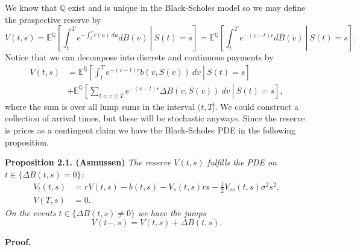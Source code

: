 \documentclass[
]{book}
\begin{document}
We know that \(\mathbb Q\) exist and is unique in the Black-Scholes model so we may define the prospective reserve by
\[
V(t,s)=\mathbb E^{\mathbb Q}\left[\left.\int_t^Te^{-\int_t^vr(u)\ du}dB(v)\ \right\vert\ S(t)=s\right]=\mathbb E^{\mathbb Q}\left[\left.\int_t^Te^{-(v-t)r}dB(v)\ \right\vert\ S(t)=s\right].
\]
Notice that we can decompose into discrete and continuous payments by
\begin{align*}
V(t,s)&=\mathbb E^{\mathbb Q}\left[\left.\int_t^Te^{-(v-t)r}b(v,S(v))\ dv\ \right\vert\ S(t)=s\right]\\
&+\mathbb E^{\mathbb Q}\left[\left.\sum_{t< v\le T}e^{-(v-t)r}\Delta B(v,S(v))\ dv\ \right\vert\ S(t)=s\right],
\end{align*}
where the sum is over all lump sums in the interval \((t,T]\). We could construct a collection of arrival times, but these will be stochastic anyways. Since the reserve is prices as a contingent claim we have the Black-Scholes PDE in the following proposition.

\textbf{Proposition 2.1. (Asmussen)} \emph{The reserve \(V(t,s)\) fulfills the PDE on \(t\in\{\Delta B(t,s)=0\}\):}
\begin{align*}
V_t(t,s)&=rV(t,s)-b(t,s)-V_s(t,s)rs-\frac{1}{2}V_{ss}(t,s)\sigma^2s^2,\\
V(T,s)&=0.
\end{align*}
\emph{On the events \(t\in \{\Delta B(t,s)\ne 0\}\) we have the jumps}
\[
V(t-,s)=V(t,s)+\Delta B(t,s).
\]

\textbf{Proof.}
\end{document}
